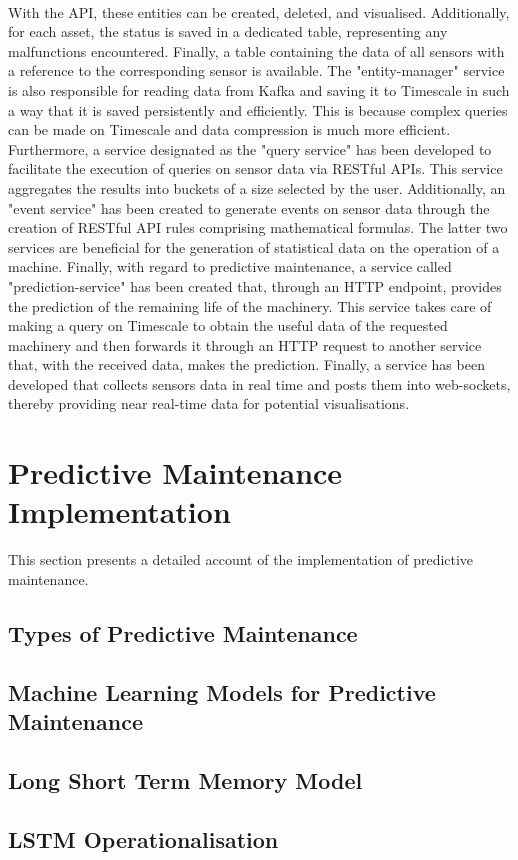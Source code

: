  \\With the API, these entities can be created, deleted, and visualised. Additionally, for each asset, the status is saved in a dedicated table, representing any malfunctions encountered. Finally, a table containing the data of all sensors with a reference to the corresponding sensor is available. The "entity-manager" service is also responsible for reading data from Kafka and saving it to Timescale in such a way that it is saved persistently and efficiently. This is because complex queries can be made on Timescale and data compression is much more efficient. Furthermore, a service designated as the "query service" has been developed to facilitate the execution of queries on sensor data via RESTful APIs. This service aggregates the results into buckets of a size selected by the user. Additionally, an "event service" has been created to generate events on sensor data through the creation of RESTful API rules comprising mathematical formulas. The latter two services are beneficial for the generation of statistical data on the operation of a machine. Finally, with regard to predictive maintenance, a service called "prediction-service" has been created that, through an HTTP endpoint, provides the prediction of the remaining life of the machinery. This service takes care of making a query on Timescale to obtain the useful data of the requested machinery and then forwards it through an HTTP request to another service that, with the received data, makes the prediction. Finally, a service has been developed that collects sensors data in real time and posts them into web-sockets, thereby providing near real-time data for potential visualisations.
\section{Predictive Maintenance Implementation}
This section presents a detailed account of the implementation of predictive maintenance.
\subsection{Types of Predictive Maintenance}
\subsection{Machine Learning Models for Predictive Maintenance}
\subsection{Long Short Term Memory Model}
\subsection{LSTM Operationalisation}














